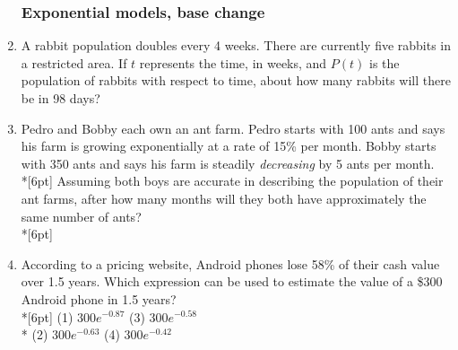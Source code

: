 \documentclass[12pt, oneside]{article}
\begin{document}
\begin{enumerate}
\subsubsection*{Exponential models, base change}
\item A rabbit population doubles every 4 weeks. There are currently five rabbits in a restricted area. If $t$ represents the time, in weeks, and $P(t)$ is the population of rabbits with respect to time, about how many rabbits will there be in 98 days?

\item Pedro and Bobby each own an ant farm. Pedro starts with 100 ants and says his farm is growing exponentially at a rate of 15\% per month. Bobby starts with 350 ants and says his farm is steadily \textit{decreasing} by 5 ants per month.\\*[6pt]
Assuming both boys are accurate in describing the population of their ant farms, after how many months will they both have approximately the same number of ants?\\*[6pt]

\item According to a pricing website, Android phones lose 58\% of their cash value over 1.5 years. Which expression can be used to estimate the value of a \$300 Android phone in 1.5 years?\\*[6pt]
(1) $300e^{-0.87}$ \qquad (3) $300e^{-0.58}$ \\*
(2) $300e^{-0.63}$ \qquad (4) $300e^{-0.42}$


\end{enumerate}
\end{document}
